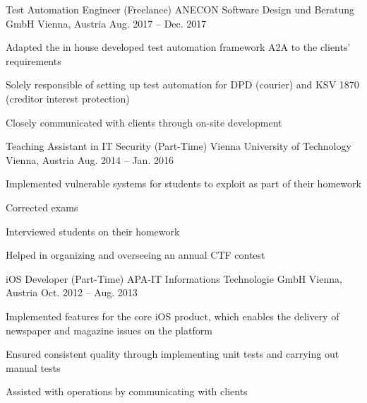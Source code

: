 \begin{cventries}

\cventry
{Test Automation Engineer (Freelance)} %
{ANECON Software Design und Beratung GmbH} %
{Vienna, Austria} %
{Aug. 2017 -- Dec. 2017} %
{ %
\begin{cvitems}
\item {Adapted the in house developed test automation framework A2A to the clients' requirements}
\item {Solely responsible of setting up test automation for DPD (courier) and KSV 1870 (creditor interest protection)}
\item {Closely communicated with clients through on-site development}
\end{cvitems}
}


\cventry
{Teaching Assistant in IT Security (Part-Time)} %
{Vienna University of Technology} %
{Vienna, Austria} %
{Aug. 2014 -- Jan. 2016} %
{ %
\begin{cvitems}
\item {Implemented vulnerable systems for students to exploit as part of their homework}
\item {Corrected exams}
\item {Interviewed students on their homework}
\item {Helped in organizing and overseeing an annual CTF contest}
\end{cvitems}
}


\cventry
{iOS Developer (Part-Time)} %
{APA-IT Informations Technologie GmbH} %
{Vienna, Austria} %
{Oct. 2012 -- Aug. 2013} %
{ %
\begin{cvitems}
\item {Implemented features for the core iOS product, which enables the delivery of newspaper and magazine issues on the platform}
\item {Ensured consistent quality through implementing unit tests and carrying out manual tests}
\item {Assisted with operations by communicating with clients}
\end{cvitems}
}


\end{cventries}